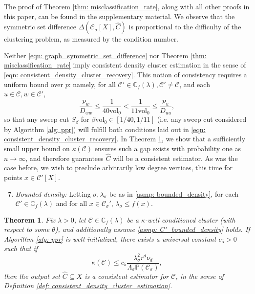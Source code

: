 \documentclass{article}
\newcommand{\vol}{\mathrm{vol}}
\newcommand{\1}{\mathbf{1}}
\newcommand{\pbf}{p}        %
\newcommand{\Xbf}{X}             %
\newcommand{\Dbf}{D}
\newcommand{\Pbb}{\mathbb{P}}
\newcommand{\Cbb}{\mathbb{C}}
\newcommand{\Cset}{\mathcal{C}}
\newcommand{\Csig}{\Cset_{\sigma}}
\newcommand{\Cest}{\widehat{C}}
\theoremstyle{aldenthm}
\newtheorem{theorem}{Theorem}
\theoremstyle{aldenrmrk}
\begin{document}
The proof of Theorem \ref{thm: misclassification_rate}, along with all other proofs in this paper, can be found in the supplementary material. We observe that the symmetric set difference $\Delta(\Csig[\Xbf], \Cest)$  is proportional to the difficulty of the clustering problem, as measured by the condition number.

Neither \eqref{eqn: graph_symmetric_set_difference} nor Theorem \ref{thm: misclassification_rate} imply consistent density cluster estimation in the sense of \eqref{eqn: consistent_density_cluster_recovery}. This notion of consistency requires a uniform bound over $\pbf$: namely, for all $\Cset' \in \Cbb_f(\lambda), \Cset' \neq \Cset$, and each $u \in \Cset, w \in \Cset'$,
\begin{equation}
\label{eqn: ppr_gap}
\frac{p_{w}}{\Dbf_{ww}} \leq \frac{1}{40\vol_0} < \frac{1}{11\vol_0} \leq \frac{p_u}{\Dbf_{uu}},
\end{equation}
so that any sweep cut $S_{\beta}$ for $\beta \vol_0 \in [1/40,1/11]$ (i.e. any sweep cut considered by Algorithm \ref{alg: ppr}) will fulfill both conditions laid out in \eqref{eqn: consistent_density_cluster_recovery}. In Theorem \ref{thm: consistent_recovery_of_density_clusters}, we show that a sufficiently small upper bound on $\kappa(\Cset)$ ensures such a gap exists with probability one as $n \to \infty$, and therefore guarantees $\Cest$ will be a consistent estimator. As was the case before, we wish to preclude arbitrarily low degree vertices, this time for points $x \in \Cset'[\Xbf]$.
\begin{enumerate}[label=(A\arabic*)]
	\setcounter{enumi}{6}
	\item 
	\label{asmp: C'_bounded_density}
	\emph{Bounded density:} Letting $\sigma,\lambda_{\sigma}$ be as in \ref{asmp: bounded_density}, for each $\Cset' \in \Cbb_f(\lambda)$ and for all $x \in \Csig'$, $\lambda_{\sigma} \leq f(x)$.
\end{enumerate}

\begin{theorem}
	\label{thm: consistent_recovery_of_density_clusters}
	Fix $\lambda > 0$, let $\Cset \in \Cbb_f(\lambda)$ be a $\kappa$-well conditioned cluster (with respect to some $\theta$), and additionally assume \ref{asmp: C'_bounded_density} holds. If Algorithm \ref{alg: ppr} is well-initialized, there exists a universal constant $c_5 > 0$ such that if
	\begin{equation}
	\label{eqn: kappa_ub}
	\kappa(\Cset) \leq c_5 \frac{\lambda_{\sigma}^2r^d \nu_d}{\Lambda_{\sigma}\Pbb(\Csig)},
	\end{equation}
	then the output set $\Cest \subseteq \Xbf$ is a consistent estimator for $\Cset$, in the sense of Definition \ref{def: consistent_density_cluster_estimation}.
\end{theorem}
\end{document}
